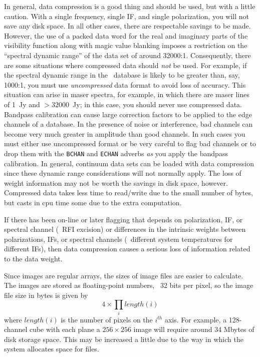      In general, data compression is a good thing and should be used,
but with a little caution.  With a single frequency, single IF, and
single polarization, you will not save any disk space.  In all other
cases, there are respectable savings to be made.  However, the use of
a packed data word for the real and imaginary parts of the visibility
function along with magic value blanking imposes a restriction on the
``spectral dynamic range'' of the data set of around 32000:1.
Consequently, there are some situations where compressed data should
{\it not} be used.  For example, if the spectral dynamic range in the
\uv\ database is likely to be greater than, say, 1000:1, you must use
{\it uncompressed} data format to avoid loss of accuracy.  This
situation can arise in maser spectra, for example, in which there are
maser lines of 1~Jy and $ >32000$~Jy; in this case, you should never
use compressed data.  Bandpass calibration can cause large correction
factors to be applied to the edge channels of a database.  In the
presence of noise or interference, bad channels can become very much
greater in amplitude than good channels.  In such cases you must
either use uncompressed format or be very careful to flag bad channels
or to drop them with the {\tt BCHAN} and {\tt ECHAN} adverbs {\it as}
you apply the bandpass calibration.  In general, continuum data sets
can be loaded with data compression since these dynamic range
considerations will not normally apply.  The
loss of weight information may not be worth the savings in disk space,
however.  Compressed data takes less time to read/write due to the
small number of bytes, but casts in cpu time some due to the extra
computation.

If there has been on-line or later flagging that depends on
polarization, IF, or spectral channel (\ie\ RFI excision) or
differences in the intrinsic weights between polarizations, IFs, or
spectral channels (\ie\ different system temperatures for different
IFs), then data compression causes a serious loss of information
related to the data weight.



     Since images are regular arrays, the sizes of image files are
easier to calculate.  The images are stored as floating-point numbers,
\ie\ 32 bits per pixel, so the image file size in bytes is given by
$$
     4 \times \prod_{i} length(i)
$$
where $length(i)$ is the number of pixels on the $i^{th}$ axis.  For
example, a 128-channel cube with each plane a $256 \times 256$ image
will require around 34 Mbytes of disk storage space.  This may be
increased a little due to the way in which the system allocates space
for files.

